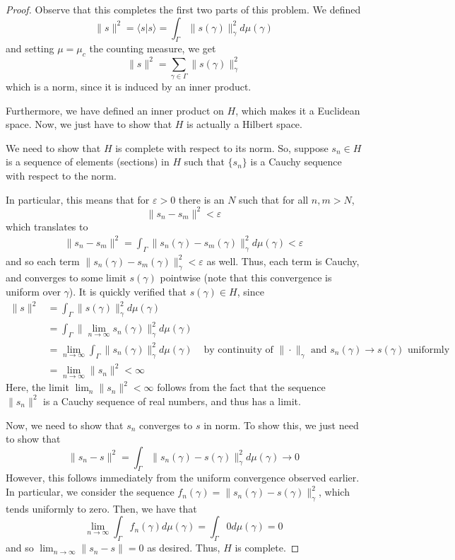 \documentclass[fontsize=11pt]{scrartcl} %
\numberwithin{equation}{section} %
\numberwithin{figure}{section} %
\numberwithin{table}{section} %
\newcommand{\la}{\langle}
\newcommand{\ra}{\rangle}
\begin{document}
\begin{proof}
    Observe that this completes the first two parts of this problem. We defined
    \[
        \|s\|^2 = \la s|s\ra = \int_{\Gamma}\|s(\gamma)\|_{\gamma}^2
        d\mu(\gamma)
    \]
    and setting $\mu = \mu_c$ the counting measure, we get
    \[
        \|s\|^2 = \sum_{\gamma\in\Gamma}\|s(\gamma)\|_{\gamma}^2
    \]
    which is a norm, since it is induced by an inner product.

    Furthermore, we have defined an inner product on $H$, which makes it a
    Euclidean space. Now, we just have to show that $H$ is actually a Hilbert
    space.


    We need to show that $H$ is complete with respect to its norm. So, suppose
    $s_n\in H$ is a sequence of elements (sections) in $H$ such that $\{s_n\}$
    is a Cauchy sequence with respect to the norm.

    In particular, this means that for $\varepsilon>0$ there is an $N$ such that
    for all $n,m>N$,
    \[
        \|s_n-s_m\|^2 < \varepsilon
    \]
    which translates to
    \[
        \begin{aligned}
            \|s_n-s_m\|^2 = \int_{\Gamma}\|s_n(\gamma) - s_m(\gamma)\|_{\gamma}^2
            d\mu(\gamma) <
            \varepsilon
    \end{aligned}
    \]
    and so each term $\|s_n(\gamma)-s_m(\gamma)\|_{\gamma}^2 < \varepsilon$ as
    well. Thus, each term is Cauchy, and converges to some limit $s(\gamma)$
    pointwise (note that this convergence is uniform over $\gamma$). It is
    quickly verified that $s(\gamma)\in H$, since
    \[
        \begin{aligned}
        \|s\|^2 &= \int_{\Gamma}\|s(\gamma)\|_{\gamma}^2d\mu(\gamma)\\
        &=
        \int_{\Gamma}\|\lim_{n\to\infty}s_n(\gamma)\|_{\gamma}^2d\mu(\gamma)\\
        &= \lim_{n\to\infty}\int_{\Gamma}\|s_n(\gamma)\|_{\gamma}^2
        d\mu(\gamma) &\text{ by continuity of $\|\cdot\|_{\gamma}$ and
        $s_n(\gamma)\to s(\gamma)$ uniformly}\\
        &= \lim_{n\to\infty}\|s_n\|^2 < \infty
        \end{aligned}
    \]
    Here, the limit $\lim_n\|s_n\|^2 <\infty$ follows from the fact that the
    sequence $\|s_n\|^2$ is a Cauchy sequence of real numbers, and thus has a
    limit.

    Now, we need to show that $s_n$ converges to $s$ in norm.
    To show this, we just need to show that
    \[
        \|s_n-s\|^2 = \int_{\Gamma}\|s_n(\gamma)- s(\gamma)\|^2_{\gamma}d\mu(\gamma)
        \to 0
    \]
    However, this follows immediately from the uniform convergence observed
    earlier. In particular, we consider the sequence $f_n(\gamma) =
    \|s_n(\gamma) - s(\gamma)\|^2_{\gamma}$, which tends uniformly to zero.
    Then, we have that
    \[
        \lim_{n\to\infty}\int_{\Gamma}f_n(\gamma)d\mu(\gamma) =
        \int_{\Gamma}0d\mu(\gamma) = 0
    \]
    and so $\lim_{n\to\infty}\|s_n-s\| = 0$ as desired. Thus, $H$ is complete.



\end{proof}
\end{document}
